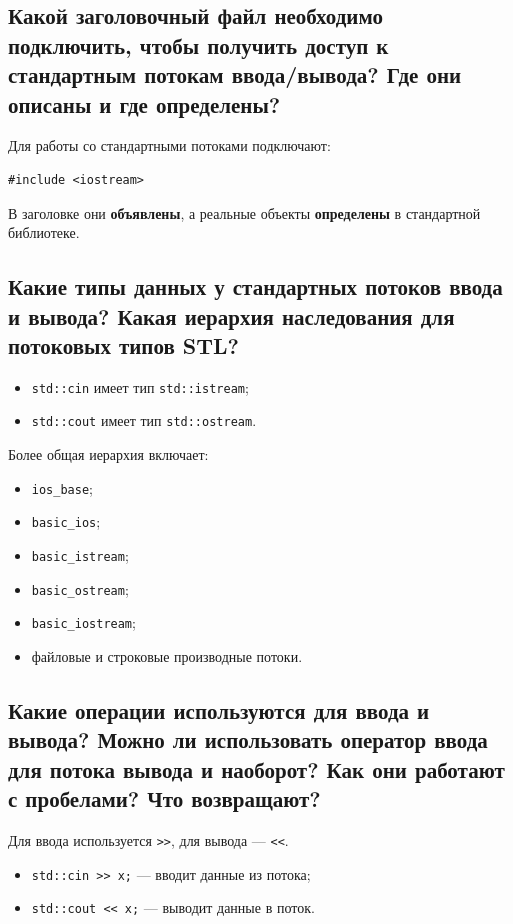 \subsection{Какой заголовочный файл необходимо подключить, чтобы получить доступ к стандартным потокам ввода/вывода? Где они описаны и где определены?}

Для работы со стандартными потоками подключают:
\begin{verbatim}
#include <iostream>
\end{verbatim}

В заголовке они \textbf{объявлены}, а реальные объекты \textbf{определены} в стандартной библиотеке.


\subsection{Какие типы данных у стандартных потоков ввода и вывода? Какая иерархия наследования для потоковых типов STL?}

\begin{itemize}
    \item \texttt{std::cin} имеет тип \texttt{std::istream};
    \item \texttt{std::cout} имеет тип \texttt{std::ostream}.
\end{itemize}

Более общая иерархия включает:
\begin{itemize}
    \item \texttt{ios\_base};
    \item \texttt{basic\_ios};
    \item \texttt{basic\_istream};
    \item \texttt{basic\_ostream};
    \item \texttt{basic\_iostream};
    \item файловые и строковые производные потоки.
\end{itemize}


\subsection{Какие операции используются для ввода и вывода? Можно ли использовать оператор ввода для потока вывода и наоборот? Как они работают с пробелами? Что возвращают?}

Для ввода используется \texttt{>>}, для вывода --- \texttt{<<}.

\begin{itemize}
    \item \texttt{std::cin >> x;} --- вводит данные из потока;
    \item \texttt{std::cout << x;} --- выводит данные в поток.
\end{itemize}

